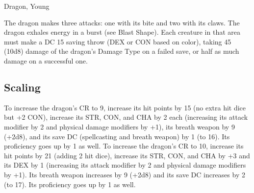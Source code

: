 \begin{DndMonster}[width=\textwidth + 8pt]{Dragon, Young}
\begin{multicols}{2}
 The dragon makes three attacks: one with its bite and two with its claws.
\DndMonsterAttack[
	name=Bite,
	distance=melee,
	type=weapon,
	mod=+8,
	reach=10,
	dmg=\DndDice{2d10 + 5},
	dmg-type=piercing,
	extra={ plus 4 (1d8) damage of the dragon's Damage Type.}
]
\DndMonsterAttack[
	name=Claw,
	distance=melee,
	type=weapon,
	mod=+8,
	reach=5,
	dmg=\DndDice{2d6 + 5},
	dmg-type=slashing
]
The dragon exhales energy in a burst (see Blast Shape). Each creature in that area must make a DC 15 saving throw (DEX or CON based on color), taking 45 (10d8) damage of the dragon's Damage Type on a failed save, or half as much damage on a successful one.
\subsection{Scaling}
To increase the dragon's CR to 9, increase its hit points by 15 (no extra hit dice but +2 CON), increase its STR, CON, and CHA by 2 each (increasing its attack modifier by 2 and physical damage modifiers by +1), its breath weapon by 9 (+2d8), and its save DC (spellcasting and breath weapon) by 1 (to 16). Its proficiency goes up by 1 as well.
To increase the dragon's CR to 10, increase its hit points by 21 (adding 2 hit dice), increase its STR, CON, and CHA by +3 and its DEX by 1 (increasing its attack modifier by 2 and physical damage modifiers by +1). Its breath weapon increases by 9 (+2d8) and its save DC increases by 2 (to 17). Its proficiency goes up by 1 as well.
\end{multicols}
\end{DndMonster}

